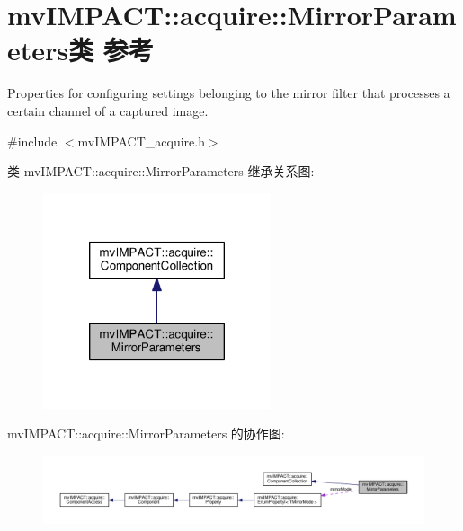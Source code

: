 \hypertarget{classmv_i_m_p_a_c_t_1_1acquire_1_1_mirror_parameters}{\section{mv\+I\+M\+P\+A\+C\+T\+:\+:acquire\+:\+:Mirror\+Parameters类 参考}
\label{classmv_i_m_p_a_c_t_1_1acquire_1_1_mirror_parameters}
}


Properties for configuring settings belonging to the mirror filter that processes a certain channel of a captured image.  




{\ttfamily \#include $<$mv\+I\+M\+P\+A\+C\+T\+\_\+acquire.\+h$>$}



类 mv\+I\+M\+P\+A\+C\+T\+:\+:acquire\+:\+:Mirror\+Parameters 继承关系图\+:
\nopagebreak
\begin{figure}[H]
\begin{center}
\leavevmode
\includegraphics[width=190pt]{classmv_i_m_p_a_c_t_1_1acquire_1_1_mirror_parameters__inherit__graph}
\end{center}
\end{figure}


mv\+I\+M\+P\+A\+C\+T\+:\+:acquire\+:\+:Mirror\+Parameters 的协作图\+:
\nopagebreak
\begin{figure}[H]
\begin{center}
\leavevmode
\includegraphics[width=350pt]{classmv_i_m_p_a_c_t_1_1acquire_1_1_mirror_parameters__coll__graph}
\end{center}
\end{figure}
